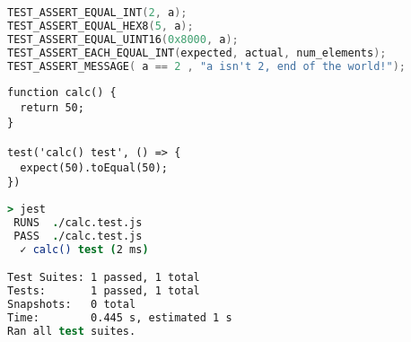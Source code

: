 \begin{lstlisting}[language=c, label={lst:unity-more-test-assert}, caption=More advanced Unity Assertions
\cite{unity-github}]
TEST_ASSERT_EQUAL_INT(2, a);
TEST_ASSERT_EQUAL_HEX8(5, a);
TEST_ASSERT_EQUAL_UINT16(0x8000, a);
TEST_ASSERT_EACH_EQUAL_INT(expected, actual, num_elements);
TEST_ASSERT_MESSAGE( a == 2 , "a isn't 2, end of the world!");
\end{lstlisting}

\begin{lstlisting}[style=ES6, label=lst:jest-example, caption={Jest Unit Testing Example}]
function calc() {
  return 50;
}

test('calc() test', () => {
  expect(50).toEqual(50);
})
\end{lstlisting}

\begin{lstlisting}[language=csh, label=lst:jest-output, caption={Jest Unit
Testing Example Output}]
> jest
 RUNS  ./calc.test.js
 PASS  ./calc.test.js
  ✓ calc() test (2 ms)

Test Suites: 1 passed, 1 total
Tests:       1 passed, 1 total
Snapshots:   0 total
Time:        0.445 s, estimated 1 s
Ran all test suites.
\end{lstlisting}
